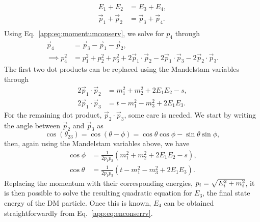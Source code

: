\begin{align}
    E_1 + E_2 & = E_3 + E_4,\label{app:eq:enconserrv}\\
    \vec{p}_1 + \vec{p}_2 & = \vec{p}_3 + \vec{p}_4.\label{app:eq:momentumconserv}\\
\end{align}
Using Eq.~\ref{app:eq:momentumconserv}, we solve for $p_4$ through
\begin{align}
    \vec{p}_4 & = \vec{p}_3 - \vec{p}_1 - \vec{p}_2,\\
    \implies p^2_4 & = p^2_1 + p^2_2 + p^2_3 + 2\vec{p}_1\cdot \vec{p}_2 - 2\vec{p}_1\cdot \vec{p}_3 - 2\vec{p}_2\cdot \vec{p}_3.
\end{align}
The first two dot products can be replaced using the Mandelstam variables through
\begin{align}
    2\vec{p}_1\cdot \vec{p}_2 & = m_1^2 + m_2^2 + 2E_1 E_2 - s,\\
    2\vec{p}_1\cdot \vec{p}_3 & = t - m_1^2-m_3^2 + 2E_1 E_3.
\end{align}
For the remaining dot product, $\vec{p}_2\cdot \vec{p}_3$, some care is needed. We start by writing the angle between $\vec{p}_2$ and $\vec{p}_3$ as 
\begin{equation}
    \cos(\theta_{23}) = \cos(\theta - \phi) = \cos\theta\cos\phi - \sin\theta\sin\phi,
\end{equation}
then, again using the Mandelstam variables above, we have
\begin{align}
    \cos\phi & = \frac{1}{2p_1 p_2}(m_1^2 + m_2^2 + 2E_1 E_2 - s),\\
    \cos\theta & = \frac{1}{2p_1 p_3}(t - m_1^2 - m_3^2 + 2E_1 E_3).
\end{align}
Replacing the momentum with their corresponding energies, $p_i = \sqrt{E_i^2 + m_i^2}$, it is then possible to solve the resulting quadratic equation for $E_3$, the final state energy of the DM particle. Once this is known, $E_4$ can be obtained straightforwardly from Eq.~\ref{app:eq:enconserrv}.

